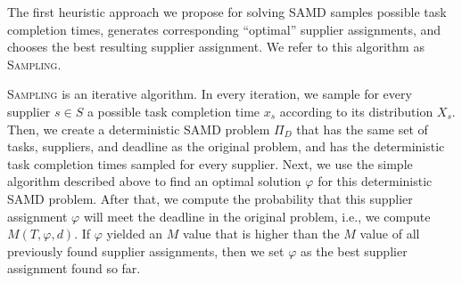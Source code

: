 \documentclass[letterpaper]{article} %
\newcommand{\samd}{\ac{SAMD}\xspace}
\newcommand{\sampling}{\textsc{Sampling}\xspace}
\begin{document}
The first heuristic approach we propose for solving \samd samples possible task completion times, generates corresponding ``optimal'' supplier assignments, and chooses the best resulting supplier assignment. We refer to this algorithm as \sampling.


\sampling is an iterative algorithm.
In every iteration, we sample for every supplier $s\in S$ a possible task completion time $x_s$ according to its distribution $X_s$.
Then, we create a deterministic \samd problem $\Pi_D$ that has the same set of tasks, suppliers, and deadline as the original problem, and has the deterministic task completion times sampled for every supplier. Next, we use the simple algorithm described above to find an optimal solution $\varphi$ for this deterministic \samd problem. After that, we compute the probability that this supplier assignment $\varphi$ will meet the deadline in the original problem, i.e., we compute $M(T,\varphi,d)$. If $\varphi$ yielded an $M$ value that is higher than the $M$ value of all previously found supplier assignments, then we set $\varphi$ as the best supplier assignment found so far.



\end{document}
